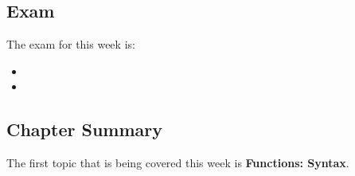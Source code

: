 \subsection{Exam}

The exam for this week is:

\begin{itemize}
    \item {}
    \item {}
\end{itemize}

\subsection{Chapter Summary}

The first topic that is being covered this week is \textbf{Functions: Syntax}.

